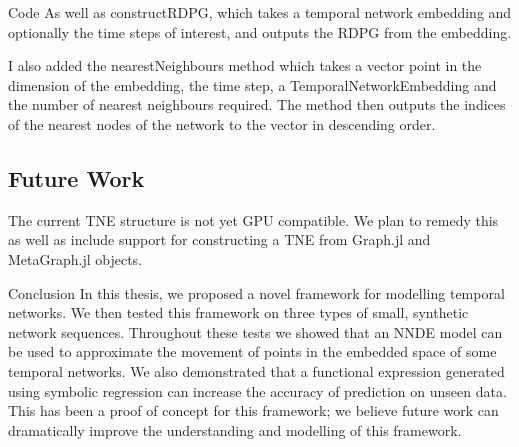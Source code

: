 \documentclass[12pt]{amsart}
\begin{document}
\begin{section}{Code}
        As well as constructRDPG, which takes a temporal network embedding and optionally the time steps of interest, and outputs the RDPG from the embedding.

        I also added the nearestNeighbours method which takes a vector point in the dimension of the embedding, the time step, a TemporalNetworkEmbedding and the number of nearest neighbours required. The method then outputs the indices of the nearest nodes of the network to the vector in descending order.

    \subsection{Future Work}
        The current TNE structure is not yet GPU compatible. We plan to remedy this as well as include support for constructing a TNE from Graph.jl and MetaGraph.jl objects.

\end{section}
\begin{section}{Conclusion}
    In this thesis, we proposed a novel framework for modelling temporal networks. We then tested this framework on three types of small, synthetic network sequences. Throughout these tests we showed that an NNDE model can be used to approximate the movement of points in the embedded space of some temporal networks. We also demonstrated that a functional expression generated using symbolic regression can increase the accuracy of prediction on unseen data. This has been a proof of concept for this framework; we believe future work can dramatically improve the understanding and modelling of this framework.
\end{section} 


\printbibliography
\end{document}
